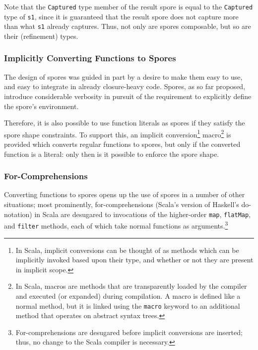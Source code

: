 \documentclass[runningheads]{llncs}
\begin{document}
\begin{sloppypar}
\noindent Note that the \verb|Captured| type member of the result spore is equal to the
\verb|Captured| type of \verb|s1|, since it is guaranteed that the result
spore does not capture more than what \verb|s1| already captures. Thus, not
only are spores composable, but so are their (refinement) types.


\subsubsection{Implicitly Converting Functions to Spores}

The design of spores was guided in part by a desire to make them easy to use,
and easy to integrate in already closure-heavy code. Spores, as so far
proposed, introduce considerable verbosity in pursuit of the requirement to
explicitly define the spore's environment.

Therefore, it is also possible to use function literals as spores if they
satisfy the spore shape constraints. To support this, an implicit
conversion\footnote{In Scala, implicit conversions can be thought of as methods which can be implicitly invoked based upon their type, and whether or not they are present in implicit scope.}
macro\footnote{In Scala, macros are methods that are transparently loaded by the compiler and executed (or expanded) during compilation. A macro is defined like a normal method, but it is linked using the \texttt{macro} keyword to an additional method that operates on abstract syntax trees.} is provided which converts regular
functions to spores, but only if the converted function is a literal: only
then is it possible to enforce the spore shape.

\subsubsection{For-Comprehensions}

Converting functions to spores opens up the use of spores in a number of other
situations; most prominently, for-comprehensions (Scala's version of Haskell's do-notation) in Scala
are desugared to invocations of the higher-order \verb|map|, \verb|flatMap|, and \verb|filter|
methods, each of which take normal functions as arguments.\footnote{For-comprehensions are desugared
before implicit conversions are inserted; thus, no change to the Scala compiler is necessary.}


\end{sloppypar}
\end{document}
